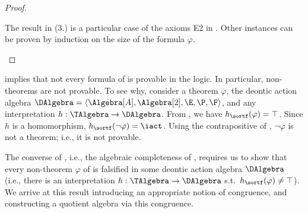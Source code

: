 \begin{proof}
\begin{enumerate}[leftmargin=\parindent]
			\smallskip
			\noindent
			The result in (3.) is a particular case of the axioms E2 in .
			Other instances can be proven by induction on the size of the formula $\varphi$.
			\qedhere
	\end{enumerate}
\end{proof}

 implies that not every formula of \DAL is provable in the logic.
In particular, non-theorems are not provable.
To see why, consider a theorem $\varphi$, the deontic action algebra $\DAlgebra = \langle \Algebra[A], \Algebra[2], \E, \P, \F \rangle$, and any interpretation $h: \TAlgebra \to \DAlgebra$.
From , we have $h_{\sortf}(\varphi) = \top$.
Since $h$ is a homomorphism, $h_{\sortf}(\lnot \varphi) = \iact$.
Using the contrapositive of , $\lnot \varphi$ is not a theorem; i.e., it is not provable.

The converse of , i.e., the algebraic completeness of \DAL, requires us to show that every non-theorem $\varphi$ of \DAL is falsified in some deontic action algebra $\DAlgebra$ (i.e., there is an interpretation $h: \TAlgebra \to \DAlgebra$ s.t.\ $h_{\sortf}(\varphi) \neq \top$).
We arrive at this result introducing an appropriate notion of congruence, and constructing a quotient algebra via this congruence. 

\medskip
{}
\medskip

